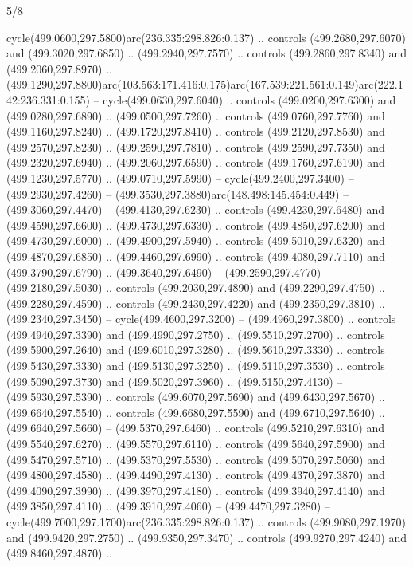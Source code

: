 \begin{flagdescription}{5/8}
\begin{scope}[xshift=0.5\flaglength,yshift=0.5\flagwidth,scale=\flagwidth/475.63]
\begin{scope}[y=0.8pt, x=0.8pt, yscale=-1, xscale=1,shift={(-450,-300)}]
\begin{scope}[cm={{1.0,0.0,0.0,1.0,(-0.0002,0.12556)}},cm={{1.0,0.0,0.0,1.0,(0.00179,0.0)}}]
\begin{scope}[cm={{1.11592,0.0,0.0,1.11592,(-106.89933,-41.77764)}}]
\begin{scope}[draw=black,fill=cfff]
\begin{scope}[fill=black]
  cycle(499.0600,297.5800)arc(236.335:298.826:0.137) .. controls
  (499.2680,297.6070) and (499.3020,297.6850) .. (499.2940,297.7570) .. controls
  (499.2860,297.8340) and (499.2060,297.8970) ..
  (499.1290,297.8800)arc(103.563:171.416:0.175)arc(167.539:221.561:0.149)arc(222.142:236.331:0.155)
  -- cycle(499.0630,297.6040) .. controls (499.0200,297.6300) and
  (499.0280,297.6890) .. (499.0500,297.7260) .. controls (499.0760,297.7760) and
  (499.1160,297.8240) .. (499.1720,297.8410) .. controls (499.2120,297.8530) and
  (499.2570,297.8230) .. (499.2590,297.7810) .. controls (499.2590,297.7350) and
  (499.2320,297.6940) .. (499.2060,297.6590) .. controls (499.1760,297.6190) and
  (499.1230,297.5770) .. (499.0710,297.5990) -- cycle(499.2400,297.3400) --
  (499.2930,297.4260) -- (499.3530,297.3880)arc(148.498:145.454:0.449) --
  (499.3060,297.4470) -- (499.4130,297.6230) .. controls (499.4230,297.6480) and
  (499.4590,297.6600) .. (499.4730,297.6330) .. controls (499.4850,297.6200) and
  (499.4730,297.6000) .. (499.4900,297.5940) .. controls (499.5010,297.6320) and
  (499.4870,297.6850) .. (499.4460,297.6990) .. controls (499.4080,297.7110) and
  (499.3790,297.6790) .. (499.3640,297.6490) -- (499.2590,297.4770) --
  (499.2180,297.5030) .. controls (499.2030,297.4890) and (499.2290,297.4750) ..
  (499.2280,297.4590) .. controls (499.2430,297.4220) and (499.2350,297.3810) ..
  (499.2340,297.3450) -- cycle(499.4600,297.3200) -- (499.4960,297.3800) ..
  controls (499.4940,297.3390) and (499.4990,297.2750) .. (499.5510,297.2700) ..
  controls (499.5900,297.2640) and (499.6010,297.3280) .. (499.5610,297.3330) ..
  controls (499.5430,297.3330) and (499.5130,297.3250) .. (499.5110,297.3530) ..
  controls (499.5090,297.3730) and (499.5020,297.3960) .. (499.5150,297.4130) --
  (499.5930,297.5390) .. controls (499.6070,297.5690) and (499.6430,297.5670) ..
  (499.6640,297.5540) .. controls (499.6680,297.5590) and (499.6710,297.5640) ..
  (499.6640,297.5660) -- (499.5370,297.6460) .. controls (499.5210,297.6310) and
  (499.5540,297.6270) .. (499.5570,297.6110) .. controls (499.5640,297.5900) and
  (499.5470,297.5710) .. (499.5370,297.5530) .. controls (499.5070,297.5060) and
  (499.4800,297.4580) .. (499.4490,297.4130) .. controls (499.4370,297.3870) and
  (499.4090,297.3990) .. (499.3970,297.4180) .. controls (499.3940,297.4140) and
  (499.3850,297.4110) .. (499.3910,297.4060) -- (499.4470,297.3280) --
  cycle(499.7000,297.1700)arc(236.335:298.826:0.137) .. controls
  (499.9080,297.1970) and (499.9420,297.2750) .. (499.9350,297.3470) .. controls
  (499.9270,297.4240) and (499.8460,297.4870) ..

\end{scope}
\end{scope}
\end{scope}
\end{scope}
\end{scope}
\end{scope}
\end{flagdescription}

